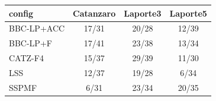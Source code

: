 \begin{tabular}{lccc}
\toprule
config & Catanzaro & Laporte3 & Laporte5 \\
\midrule
BBC-LP+ACC & 17/31 & 20/28 & 12/39 \\
BBC-LP+F & 17/41 & 23/38 & 13/34 \\
CATZ-F4 & 15/37 & 29/39 & 11/30 \\
LSS & 12/37 & 19/28 & 6/34 \\
SSPMF & 6/31 & 23/34 & 20/35 \\
\bottomrule
\end{tabular}